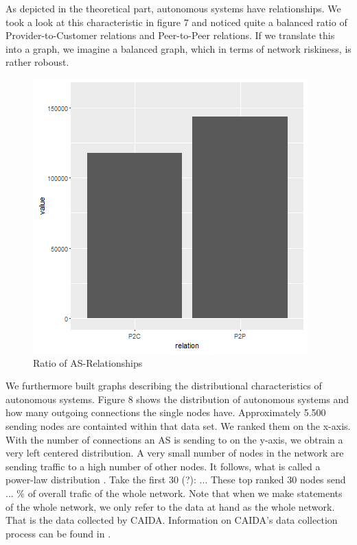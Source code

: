 \documentclass[conference, 11pt]{IEEEtran}
\begin{document}
As depicted in the theoretical part, autonomous systems have relationships. We took a look at this characteristic in figure 7 and noticed quite a balanced ratio of Provider-to-Customer relations and Peer-to-Peer relations. If we translate this into a graph, we imagine a balanced graph, which in terms of network riskiness, is rather roboust. 

\begin{figure}[htbp]
\centerline{\includegraphics[scale=0.45]{Graphics/relationspeerandprovider.png}}
\caption{Ratio of AS-Relationships }
\label{fig}
\end{figure}


We furthermore built graphs describing the distributional characteristics of autonomous systems. Figure 8 shows the distribution of autonomous systems and how many outgoing connections the single nodes have. Approximately 5.500 sending nodes are containted within that data set. We ranked them on the x-axis. With the number of connections an AS is sending to on the y-axis, we obtrain a very left centered distribution. A very small number of nodes in the network are sending traffic to a high number of other nodes. It follows, what is called a power-law distribution  \cite{powerlawCitation}. Take the first 30 (?): ... These top ranked 30 nodes send ... \% of overall trafic of the whole network. Note that when we make statements of the whole network, we only refer to the data at hand as the whole network. That is the data collected by CAIDA. Information on CAIDA's data collection process can be found in \cite{CaidaDataCollection} . 
\end{document}
